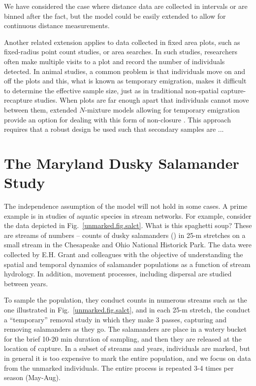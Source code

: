 We have considered the case where distance data are collected in
intervals or are binned after the fact, but the model could be easily
extended to allow for continuous distance measurements.

Another
related extension applies to data collected in fixed area plots, such
as fixed-radius point count studies, or area searches. In such
studies, researchers often make multiple visits to a plot and record
the number of individuals detected. In animal studies, a common
problem is that individuals move on and off the plots and this, what
is known as temporary emigration, makes it difficult to determine the
effective sample size, just as in traditional non-spatial
capture-recapture studies. When plots are far enough apart that
individuals cannot move between them, extended $N$-mixture models
allowing for temporary emigration provide an option for dealing with
this form of non-closure \citep{chandler_etal:2011}. This approach
requires that a robust design be used such that secondary samples are
...

\section{The Maryland Dusky Salamander Study}

The independence assumption of the \citet{chandler_etal:2011} model
will not hold in some cases. A prime example is in studies of aquatic
species in stream networks. For example, consider the data depicted in
Fig.~\ref{unmarked.fig.salct}. What is this spaghetti soup? These
are streams of numbers -- counts of dusky salamanders
(\textit{}) in 25-m stretches on a small stream in the Chesapeake and
Ohio National Historick Park. The data were collected by E.H. Grant
and colleagues with the objective of understanding the spatial and
temporal dynamics of salamander populations as a function of stream
hydrology. In addition, movement processes, including dispersal are
studied between years.

To sample the population, they conduct counts in numerous streams such
as the one illustrated in Fig.~\ref{unmarked.fig.salct}, and in each
25-m stretch, the conduct a ``temporary'' removal study in which they
make 3 passes, capturing and removing salamanders as they go. The
salamanders are place in a watery bucket for the brief 10-20 min
duration of sampling, and then they are released at the location of
capture. In a subset of streams and years, individuals
are marked, but in general it is too expensive to mark the entire
population, and we focus on data from the unmarked individuals.
The entire process is repeated 3-4 times per season (May-Aug).

